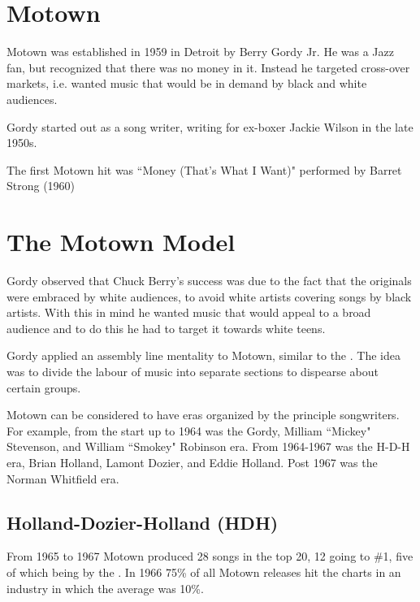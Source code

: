 \documentclass[12pt, a4paper, twoside, openright, titlepage]{book}
\begin{document}
\section{Motown}

Motown was established in 1959 in Detroit by Berry Gordy Jr. He was a Jazz fan, but recognized that there was no money in it. Instead he targeted cross-over markets, i.e. wanted music that would be in demand by black and white audiences.

\begin{note}{}{}
    Gordy started out as a song writer, writing for ex-boxer Jackie Wilson in the late 1950s.
\end{note}

\begin{rmk}{}{}
    The first Motown hit was ``Money (That's What I Want)" performed by Barret Strong (1960)
\end{rmk}


\section{The Motown Model}

Gordy observed that Chuck Berry's success was due to the fact that the originals were embraced by white audiences, to avoid white artists covering songs by black artists. With this in mind he wanted music that would appeal to a broad audience and to do this he had to target it towards white teens.

Gordy applied an assembly line mentality to Motown, similar to the . The idea was to divide the labour of music into separate sections to dispearse about certain groups.

\begin{rmk}{}{}
    Motown can be considered to have eras organized by the principle songwriters. For example, from the start up to 1964 was the Gordy, Milliam ``Mickey" Stevenson, and William ``Smokey" Robinson era. From 1964-1967 was the H-D-H era, Brian Holland, Lamont Dozier, and Eddie Holland. Post 1967 was the Norman Whitfield era.
\end{rmk}


\subsection{Holland-Dozier-Holland (HDH)}

From 1965 to 1967 Motown produced 28 songs in the top 20, 12 going to \#1, five of which being by the . In 1966 75\% of all Motown releases hit the charts in an industry in which the average was 10\%.
\end{document}

